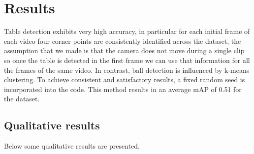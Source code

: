 \section{Results}

Table detection exhibits very high accuracy, in particular for each initial frame of each video four corner points are consistently identified across the dataset, the assumption that we made is that the camera does not move during a single clip so once the table is detected in the first frame we can use that information for all the frames of the same video.
In contrast, ball detection is influenced by k-means clustering. To achieve consistent and satisfactory results, a fixed random seed is incorporated into the code. This method results in an average mAP of 0.51 for the dataset.

\subsection{Qualitative results}
Below some qualitative results are presented.

